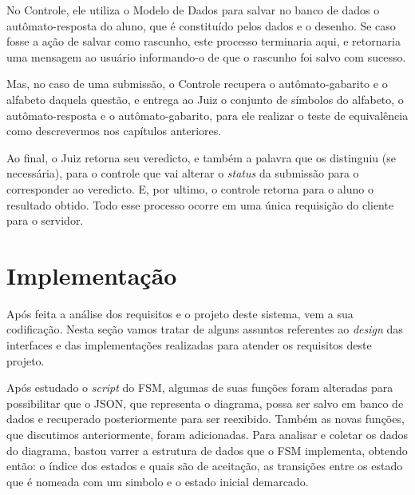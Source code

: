\documentclass[
	12pt,				%
	openany,
	oneside,
	a4paper,			%
	english,			%
	brazil				%
	]{abntex2}
\begin{document}
  No Controle, ele utiliza o Modelo de Dados para salvar no banco de dados o autômato-resposta do aluno, que é constituído pelos dados e o desenho. Se caso fosse a ação de salvar como rascunho, este processo terminaria aqui, e retornaria uma mensagem ao usuário informando-o de que o rascunho foi salvo com sucesso. 
  
  Mas, no caso de uma submissão, o Controle recupera o autômato-gabarito e o alfabeto daquela questão, e entrega ao Juiz o conjunto de símbolos do alfabeto, o autômato-resposta e o autômato-gabarito, para ele realizar o teste de equivalência como descrevermos nos capítulos anteriores. 
   
  Ao final, o Juiz retorna seu veredicto, e também a palavra que os distinguiu (se necessária), para o controle que vai alterar o \textit{status} da submissão para o corresponder ao veredicto. E, por ultimo, o controle retorna para o aluno o resultado obtido. Todo esse processo ocorre em uma única requisição do cliente para o servidor.



\section{Implementação}

  Após feita a análise dos requisitos e o projeto deste sistema, vem a sua codificação. Nesta seção vamos tratar de alguns assuntos referentes ao \textit{design} das interfaces e das implementações realizadas para atender os requisitos deste projeto. %
  
  Após estudado o \textit{script} do FSM, algumas de suas funções foram alteradas para possibilitar que o JSON, que representa o diagrama, possa ser salvo em banco de dados e recuperado posteriormente para ser reexibido. Também as novas funções, que discutimos anteriormente, foram adicionadas. Para analisar e coletar os dados do diagrama, bastou varrer a estrutura de dados que o FSM implementa, obtendo então: o índice dos estados e quais são de aceitação, as transições entre os estado que é nomeada com um simbolo e o estado inicial demarcado.
  
  
\end{document}
